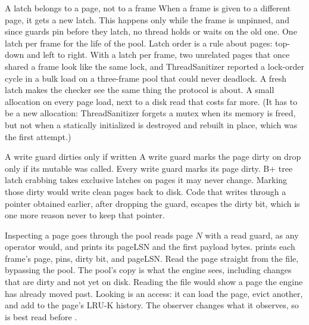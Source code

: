 \begin{decision}{A latch belongs to a page, not to a frame}
 When a frame is given to a different page, it gets a new latch.
This happens only while the frame is unpinned, and since guards pin before they
latch, no thread holds or waits on the old one.
 One latch per frame for the life of the pool.
 Latch order is a rule about pages: top-down and left to right. With
a latch per frame, two unrelated pages that once shared a frame look like the
same lock, and ThreadSanitizer reported a lock-order cycle in a bulk load on a
three-frame pool that could never deadlock. A fresh latch makes the checker see
the same thing the protocol is about.
 A small allocation on every page load, next to a disk read that
costs far more. (It has to be a new allocation: ThreadSanitizer forgets a mutex
when its memory is freed, but not when a statically initialized
 is destroyed and rebuilt in place, which was the first
attempt.)
\end{decision}

\begin{decision}{A write guard dirties only if written}
 A write guard marks the page dirty on drop only if its mutable
 was called.
 Every write guard marks its page dirty.
 B+ tree latch crabbing takes exclusive latches on pages it may
never change. Marking those dirty would write clean pages back to disk.
 Code that writes through a pointer obtained earlier, after
dropping the guard, escapes the dirty bit, which is one more reason never to
keep that pointer.
\end{decision}

\begin{decision}{Inspecting a page goes through the pool}
  reads page $N$ with a read guard,
as any operator would, and prints its pageLSN and the first payload bytes.
 prints each frame's page, pins, dirty bit, and
pageLSN.
 Read the page straight from the file, bypassing the pool.
 The pool's copy is what the engine sees, including changes that
are dirty and not yet on disk. Reading the file would show a page the engine
has already moved past.
 Looking is an access: it can load the page, evict another, and add
to the page's LRU-K history. The observer changes what it observes, so
 is best read before .
\end{decision}

